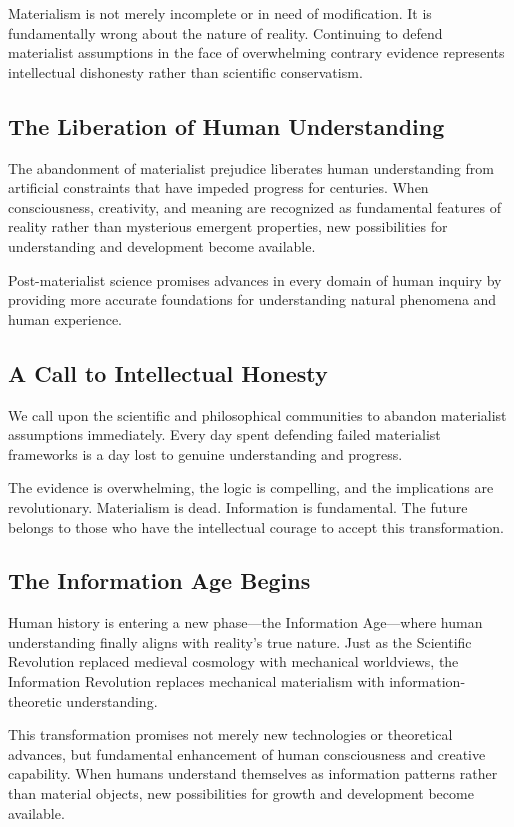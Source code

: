 \documentclass[12pt]{article}
\begin{document}
Materialism is not merely incomplete or in need of modification. It is fundamentally wrong about the nature of reality. Continuing to defend materialist assumptions in the face of overwhelming contrary evidence represents intellectual dishonesty rather than scientific conservatism.

\subsection{The Liberation of Human Understanding}

The abandonment of materialist prejudice liberates human understanding from artificial constraints that have impeded progress for centuries. When consciousness, creativity, and meaning are recognized as fundamental features of reality rather than mysterious emergent properties, new possibilities for understanding and development become available.

Post-materialist science promises advances in every domain of human inquiry by providing more accurate foundations for understanding natural phenomena and human experience.

\subsection{A Call to Intellectual Honesty}

We call upon the scientific and philosophical communities to abandon materialist assumptions immediately. Every day spent defending failed materialist frameworks is a day lost to genuine understanding and progress.

The evidence is overwhelming, the logic is compelling, and the implications are revolutionary. Materialism is dead. Information is fundamental. The future belongs to those who have the intellectual courage to accept this transformation.

\subsection{The Information Age Begins}

Human history is entering a new phase—the Information Age—where human understanding finally aligns with reality's true nature. Just as the Scientific Revolution replaced medieval cosmology with mechanical worldviews, the Information Revolution replaces mechanical materialism with information-theoretic understanding.

This transformation promises not merely new technologies or theoretical advances, but fundamental enhancement of human consciousness and creative capability. When humans understand themselves as information patterns rather than material objects, new possibilities for growth and development become available.
\end{document}
